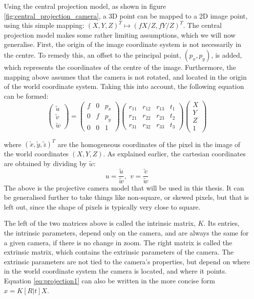 Using the central projection model, as shown in figure \ref{fig:central_projection_camera}, a 3D point can be mapped to a 2D image point, using this simple mapping: $(X,Y,Z)^T\mapsto(fX/Z,fY/Z)^T$.
The central projection model makes some rather limiting assumptions, which we will now generalise.
First, the origin of the image coordinate system is not necessarily in the centre.
To remedy this, an offset to the principal point, $(p_{x}, p_{y})$, is added, which represents the coordinates of the centre of the image.
Furthermore, the mapping above assumes that the camera is not rotated, and located in the origin of the world coordinate system. Taking this into account, the following equation can be formed:
\begin{equation}\label{eq:projection1}
\begin{pmatrix}	\tilde{u}\\\tilde{v}\\\tilde{w}\end{pmatrix} = 
\begin{pmatrix}
	f & 0 & p_{x}\\
	0 & f & p_{y}\\
	0 & 0 & 1
\end{pmatrix}
\begin{pmatrix}
	r_{11} & r_{12} & r_{13} & t_{1}\\
	r_{21} & r_{22} & r_{23} & t_{2}\\
	r_{31} & r_{32} & r_{33} & t_{3}
\end{pmatrix}
\begin{pmatrix}	X\\Y\\Z\\1\end{pmatrix}
\end{equation}

where $(\tilde{x},\tilde{y},\tilde{z})^T$ are the homogeneous coordinates of the pixel in the image of the world coordinates $(X,Y,Z)$.
As explained earlier, the cartesian coordinates are obtained by dividing by $\tilde{w}$:
$$
u = \frac{\tilde{u}}{\tilde{w}},~~v = \frac{\tilde{v}}{\tilde{w}}
$$
The above is the projective camera model that will be used in this thesis. 
It can be generalised further to take things like non-square, or skewed pixels, but that is left out, since the shape of pixels is typically very close to square.

The left of the two matrices above is called the intrinsic matrix, $K$.
Its entries, the intrinsic parameters, depend only on the camera, and are always the same for a given camera, if there is no change in zoom.
The right matrix is called the extrinsic matrix, which contains the extrinsic parameters of the camera.
The extrinsic parameters are not tied to the camera's properties, but depend on where in the world coordinate system the camera is located, and where it points.
Equation \ref{eq:projection1} can also be written in the more concise form $x = K[R|t]X$.

